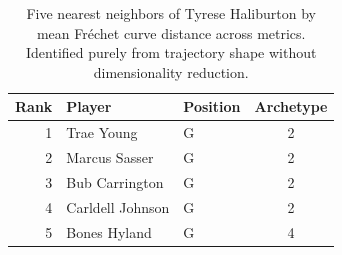 \begin{table}[htbp]
  \centering\small
  \begin{tabular}{rllc}
    \toprule
    Rank & Player & Position & Archetype \\
    \midrule
    1 & Trae Young & G & 2 \\
    2 & Marcus Sasser & G & 2 \\
    3 & Bub Carrington & G & 2 \\
    4 & Carldell Johnson & G & 2 \\
    5 & Bones Hyland & G & 4 \\
    \bottomrule
  \end{tabular}
  \caption{Five nearest neighbors of Tyrese Haliburton by mean Fr\'{e}chet curve distance across metrics. Identified purely from trajectory shape without dimensionality reduction.}
  \label{tab:Tyrese_Haliburton_frechet_curve_neighbors}
\end{table}

